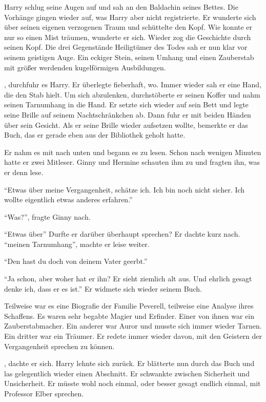 Harry schlug seine Augen auf und sah an den Baldachin seines Bettes. Die Vorhänge gingen wieder auf, was Harry aber nicht registrierte. Er wunderte sich über seinen eigenen verzogenen Traum und schüttelte den Kopf. Wie konnte er nur so einen Mist träumen, wunderte er sich. Wieder zog die Geschichte durch seinen Kopf. Die drei Gegenstände \gst Heiligtümer des Todes \gst sah er nun klar vor seinem geistigen Auge. Ein eckiger Stein, seinen Umhang und einen Zauberstab mit größer werdenden kugelförmigen Ausbildungen.

, durchfuhr es Harry. Er überlegte fieberhaft, wo. Immer wieder sah er eine Hand, die den Stab hielt. Um sich abzulenken, durchstöberte er seinen Koffer und nahm seinen Tarnumhang in die Hand.  Er setzte sich wieder auf sein Bett und legte seine Brille auf seinem Nachtschränkchen ab. Dann fuhr er mit beiden Händen über sein Gesicht. Als er seine Brille wieder aufsetzen wollte, bemerkte er das Buch, das er gerade eben aus der Bibliothek geholt hatte.

Er nahm es mit nach unten und begann es zu lesen. Schon nach wenigen Minuten hatte er zwei Mitleser. Ginny und Hermine schauten ihm zu und fragten ihn, was er denn lese.

\enquote{Etwas über meine Vergangenheit, schätze ich. Ich bin noch nicht sicher. Ich wollte eigentlich etwas anderes erfahren.}

\enquote{Was?}, fragte Ginny nach.

\enquote{Etwas über\abs} Durfte er darüber überhaupt sprechen? Er dachte kurz nach. \enquote{\aabs meinen Tarnumhang}, machte er leise weiter.

\enquote{Den hast du doch von deinem Vater geerbt.}

\enquote{Ja schon, aber woher hat er ihn? Er sieht ziemlich alt aus. Und ehrlich gesagt denke ich, dass er es ist.} Er widmete sich wieder seinem Buch.

Teilweise war es eine Biografie der Familie Peverell, teilweise eine Analyse ihres Schaffens. Es waren sehr begabte Magier und Erfinder. Einer von ihnen war ein Zauberstabmacher. Ein anderer war Auror und musste sich immer wieder Tarnen. Ein dritter war ein Träumer. Er redete immer wieder davon, mit den Geistern der Vergangenheit sprechen zu können.

, dachte er sich.  Harry lehnte sich zurück. Er blätterte nun durch das Buch und las gelegentlich wieder einen Abschnitt. Er schwankte zwischen Sicherheit und Unsicherheit. Er müsste wohl noch einmal, oder besser gesagt endlich einmal, mit Professor Elber sprechen.

